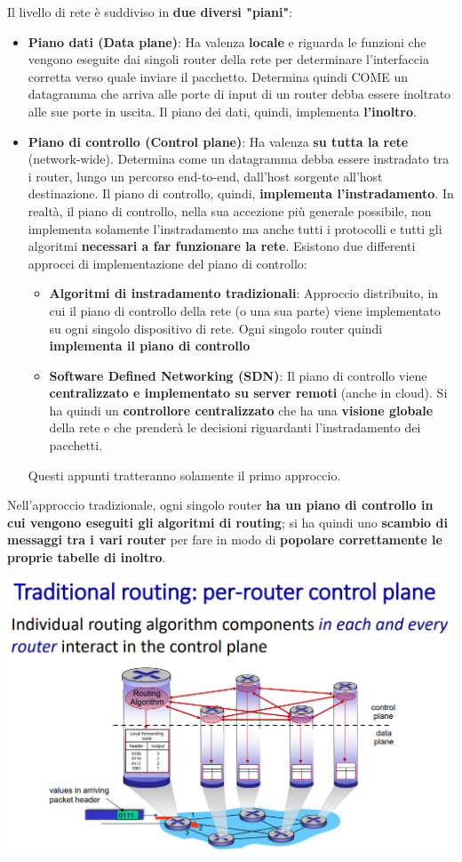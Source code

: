 \documentclass[12pt]{article}
\begin{document}
Il livello di rete è suddiviso in \textbf{due diversi "piani"}:
\begin{itemize}
    \item \textbf{Piano dati (Data plane)}: Ha valenza \textbf{locale} e riguarda le funzioni che vengono eseguite dai singoli router della rete per determinare l'interfaccia corretta verso quale inviare il pacchetto. Determina quindi COME un datagramma che arriva alle porte di input di un router debba essere inoltrato alle sue porte in uscita. Il piano dei dati, quindi, implementa \textbf{l'inoltro}.
    \item \textbf{Piano di controllo (Control plane)}: Ha valenza \textbf{su tutta la rete} (network-wide). Determina come un datagramma debba essere instradato tra i router, lungo un percorso end-to-end, dall'host sorgente all'host destinazione. Il piano di controllo, quindi, \textbf{implementa l'instradamento}.
    In realtà, il piano di controllo, nella sua accezione più generale possibile, non implementa solamente l'instradamento ma anche tutti i protocolli e tutti gli algoritmi \textbf{necessari a far funzionare la rete}. Esistono due differenti approcci di implementazione del piano di controllo:
    \begin{itemize}
        \item \textbf{Algoritmi di instradamento tradizionali}: Approccio distribuito, in cui il piano di controllo della rete (o una sua parte) viene implementato su ogni singolo dispositivo di rete. Ogni singolo router quindi \textbf{implementa il piano di controllo} 
        \item \textbf{Software Defined Networking (SDN)}: Il piano di controllo viene \textbf{centralizzato e implementato su server remoti} (anche in cloud). Si ha quindi un \textbf{controllore centralizzato} che ha una \textbf{visione globale} della rete e che prenderà le decisioni riguardanti l'instradamento dei pacchetti.
    \end{itemize}
    Questi appunti tratteranno solamente il primo approccio.
\end{itemize}
Nell'approccio tradizionale, ogni singolo router \textbf{ha un piano di controllo in cui vengono eseguiti gli algoritmi di routing}; si ha quindi uno \textbf{scambio di messaggi tra i vari router} per fare in modo di \textbf{popolare correttamente le proprie tabelle di inoltro}.
\begin{center}
    \includegraphics[width = 0.80\linewidth]{Images/74.png}
\end{center}
\end{document}
